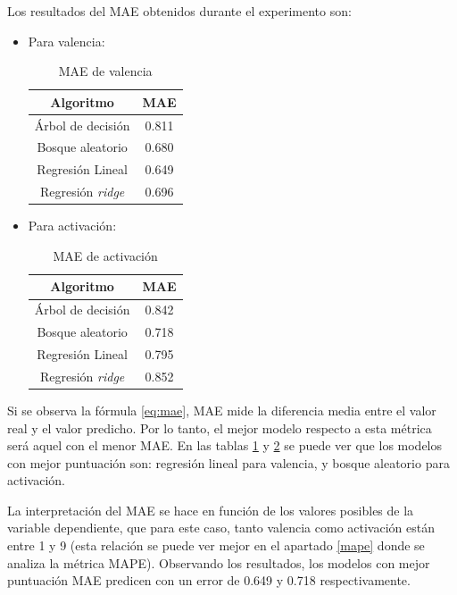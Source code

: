 \documentclass[12pt,a4paper,Spanish]{article}
\begin{document}
Los resultados del MAE obtenidos durante el experimento son:
\begin{itemize}
	\item Para valencia:
	\begin{table}[H]
		\centering
		\caption{MAE de valencia}
		\label{tab:maevalencia}
		\begin{tabular}{|c|c|}
			\hline
			\textbf{Algoritmo} & \textbf{MAE} \\
			\hline
			Árbol de decisión & 0.811 \\
			Bosque aleatorio & 0.680 \\
			Regresión Lineal & 0.649 \\
			Regresión \textit{ridge} & 0.696 \\
			\hline
		\end{tabular}
	\end{table}
	\item Para activación:
	\begin{table}[H]
		\centering
		\caption{MAE de activación}
		\label{tab:maeactivacion}
		\begin{tabular}{|c|c|}
			\hline
			\textbf{Algoritmo} & \textbf{MAE} \\
			\hline
			Árbol de decisión & 0.842 \\
			Bosque aleatorio & 0.718 \\
			Regresión Lineal & 0.795 \\
			Regresión \textit{ridge} & 0.852 \\
			\hline
		\end{tabular}
	\end{table}
\end{itemize}

Si se observa la fórmula \eqref{eq:mae}, MAE mide la diferencia media entre el valor real y el valor predicho. Por lo tanto, el mejor modelo respecto a esta métrica será aquel con el menor MAE. En las tablas \ref{tab:maevalencia} y \ref{tab:maeactivacion} se puede ver que los modelos con mejor puntuación son: regresión lineal para valencia, y bosque aleatorio para activación.
\newline

La interpretación del MAE se hace en función de los valores posibles de la variable dependiente, que para este caso, tanto valencia como activación están entre 1 y 9 (esta relación se puede ver mejor en el apartado \ref{mape} donde se analiza la métrica MAPE). Observando los resultados, los modelos con mejor puntuación MAE predicen con un error de 0.649 y 0.718 respectivamente.
\end{document}
